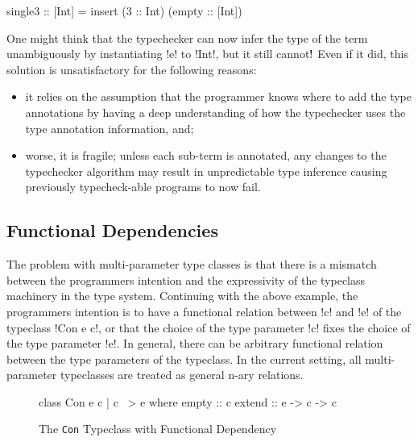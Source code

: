 \documentclass[screen,nonacm,manuscript,review]{acmart} %
\begin{document}
\begin{CenteredBox}
\begin{code}
single3 :: [Int] = insert (3 :: Int) (empty :: [Int])
\end{code}
\end{CenteredBox}

One might think that the typechecker can now infer the type of the term unambiguously by
instantiating !e! to !Int!, but it still cannot$!$ Even if it did, this
solution is unsatisfactory for the following reasons:
\begin{itemize}
\item it relies on the assumption that the programmer knows where to add the
  type annotations by having a deep understanding of how the typechecker
  uses the type annotation information, and;
\item worse, it is fragile;
  unless each sub-term is annotated, any changes to the typechecker
  algorithm may result in unpredictable type inference causing
  previously typecheck-able programs to now fail.
\end{itemize}

\subsection{Functional Dependencies}
The problem with multi-parameter type classes is that there is a
mismatch between the programmers intention and the expressivity of the
typeclass machinery in the type system. Continuing with the above example, the
programmers intention is to have a functional relation between !c! and
!e! of the typeclass !Con e c!, or that the choice of the type
parameter !c! fixes the choice of the type parameter !e!. In general,
there can be arbitrary functional relation between the type parameters
of the typeclass. In the current setting, all multi-parameter
typeclasses are treated as general n-ary relations.

\begin{figure}[ht]
\begin{CenteredBox}
\begin{code}
class Con e c | c ~> e where
  empty :: c
  extend :: e -> c -> c
\end{code}
\end{CenteredBox}
\caption[\lstinline{Con} typeclass]{The \lstinline{Con} Typeclass with Functional Dependency}
\label{fig:tc-collection-fd}
\end{figure}
\end{document}
